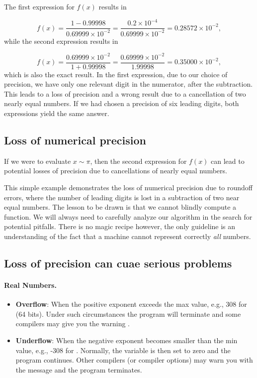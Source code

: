 \documentclass[%
twoside,                 %
final,                   %
10pt]{article}
\newenvironment{paragraphadmon}[1][]{\paragraph{#1}}{}
\begin{document}
The first expression for $f(x)$ results in

\[
   f(x)=\frac{1-0.99998}{0.69999\times 10^{-2}}=\frac{0.2\times 10^{-4}}{0.69999\times 10^{-2}}=0.28572\times 10^{-2},
\]
while the second expression results in

\[
   f(x)=\frac{0.69999\times 10^{-2}}{1+0.99998}=
\frac{0.69999\times 10^{-2}}{1.99998}=0.35000\times 10^{-2},
\]
which is also the exact result. In the first expression, due to our
choice of precision, we have
only one relevant digit in the numerator, after the
subtraction. This leads to a loss of precision and a wrong result due to
a cancellation of two nearly equal numbers.
If we had chosen a precision of six leading digits, both expressions
yield the same answer.

\subsection{Loss of numerical precision}

If we were to evaluate $x\sim \pi$, then the second expression for $f(x)$
can lead to potential losses of precision due to cancellations of nearly
equal numbers.

This simple example demonstrates  the loss of numerical precision due
to roundoff errors, where the number of leading digits is lost
in a subtraction of two near equal numbers.
The lesson to be drawn is that we cannot blindly compute a function.
We will always need to carefully analyze our algorithm in the search for
potential pitfalls. There is no magic recipe however, the only guideline
is an understanding of the fact that a machine cannot represent
correctly \emph{all} numbers.

\subsection{Loss of precision can cuae serious problems}


\begin{paragraphadmon}[Real Numbers.]

\begin{itemize}
  \item \textbf{Overflow}: When the positive exponent exceeds the max value, e.g., 308 for  (64 bits). Under such circumstances the program will terminate and some compilers may give you the warning .

  \item \textbf{Underflow}: When the negative exponent becomes smaller than the min value, e.g., -308 for . Normally, the variable is then set to zero and the program continues. Other compilers (or compiler options) may warn you with the  message and the program terminates.
\end{itemize}

\noindent
\end{paragraphadmon}
\end{document}
